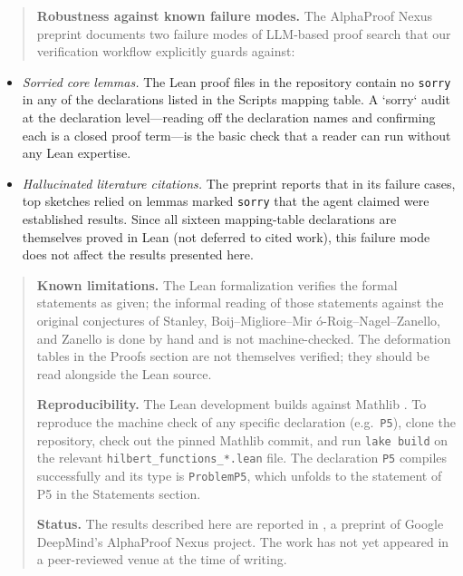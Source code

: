\documentclass[11pt,reqno]{amsart}
\begin{document}
\begin{quotation}
\medskip \noindent \textbf{Robustness against known failure modes.} The
AlphaProof Nexus preprint \cite{tsoukalas2026} documents two failure modes
of LLM-based proof search that our verification workflow explicitly guards
against:
\end{quotation}

\begin{itemize}
\item \emph{Sorried core lemmas.} The Lean proof files in the repository
contain no \texttt{sorry} in any of the declarations listed in the Scripts
mapping table. A `sorry` audit at the declaration level---reading off the
declaration names and confirming each is a closed proof term---is the basic
check that a reader can run without any Lean expertise.

\item \emph{Hallucinated literature citations.} The preprint reports that in
its failure cases, top sketches relied on lemmas marked \texttt{sorry} that
the agent claimed were established results. Since all sixteen mapping-table
declarations are themselves proved in Lean (not deferred to cited work),
this failure mode does not affect the results presented here.
\end{itemize}

\begin{quotation}
\medskip \noindent \textbf{Known limitations.} The Lean formalization
verifies the formal statements as given; the informal reading of those
statements against the original conjectures of Stanley, Boij--Migliore--Mir%
\'{o}-Roig--Nagel--Zanello, and Zanello is done by hand and is not
machine-checked. The deformation tables in the Proofs section are not
themselves verified; they should be read alongside the Lean source.

\medskip \noindent \textbf{Reproducibility.} The Lean development builds
against Mathlib \cite{mathlib2020}. To reproduce the machine check of any
specific declaration (e.g.\ \texttt{P5}), clone the repository, check out
the pinned Mathlib commit, and run \texttt{lake build} on the relevant 
\texttt{hilbert\_functions\_*.lean} file. The declaration \texttt{P5}
compiles successfully and its type is \texttt{ProblemP5}, which unfolds to
the statement of P5 in the Statements section.

\medskip \noindent \textbf{Status.} The results described here are reported
in \cite{tsoukalas2026}, a preprint of Google DeepMind's AlphaProof Nexus
project. The work has not yet appeared in a peer-reviewed venue at the time
of writing.
\end{quotation}
\end{document}

